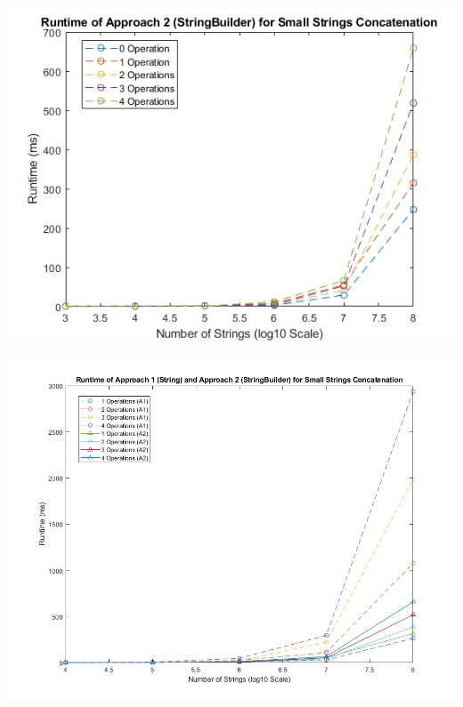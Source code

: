 \documentclass[a4paper]{article}
\begin{document}
\includegraphics[width=\textwidth]{3cA2.png}

\includegraphics[width=\textwidth]{3cT.png}
\end{document}
